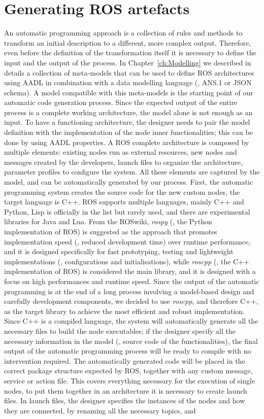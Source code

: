 \section{Generating ROS artefacts}
An automatic programming approach is a collection of rules and methods to transform an initial description to a different, more complex output. Therefore, even before the definition of the transformation itself it is necessary to define the input and the output of the process. In Chapter~\ref{ch:Modelling} we described in details a collection of meta-models that can be used to define ROS architectures using AADL in combination with a data modelling language (\ie, ANS.1 or JSON schema). A model compatible with this meta-models is the starting point of our automatic code generation process. Since the expected output of the entire process is a complete working architecture, the model alone is not enough as an input. To have a functioning architecture, the designer needs to pair the model definition with the implementation of the node inner functionalities; this can be done by using AADL properties. A ROS complete architecture is composed by multiple elements: existing nodes run as external resources, new nodes and messages created by the developers, launch files to organize the architecture, parameter profiles to configure the system. All these elements are  captured by the model, and can be automatically generated by our process. First, the automatic programming system creates the source code for the new custom nodes, the target language is C++. ROS supports multiple languages, mainly C++ and Python, Lisp is officially in the list but rarely used, and there are experimental libraries for Java and Lua. From the ROSwiki, \textit{rospy} (\ie, the Python implementation of ROS) is suggested as the approach that promotes implementation speed (\ie, reduced development time) over runtime performance, and it is designed specifically for fast prototyping, testing and lightweight implementations (\eg, configurations and initialisations), while \textit{roscpp} (\ie, the C++ implementation of ROS) is considered the main library, and it is designed with a focus on high performances and runtime speed. Since the output of the automatic programming is at the end of a long process involving a model-based design and carefully development components, we decided to use \textit{roscpp}, and therefore C++, as the target library to achieve the most efficient and robust implementation. Since C++ is a compiled language, the system will automatically generate all the necessary files to build the node executables; if the designer specify all the necessary information in the model (\ie, source code of the functionalities), the final output of the automatic programming process will be ready to compile with no intervention required. The automatically generated code will be placed in the correct package structure expected by ROS, together with any custom message, service or action file. This covers everything necessary for the execution of single nodes, to put them together in an architecture it is necessary to create launch files. In launch files, the designer specifies the instances of the nodes and how they are connected, by renaming all the necessary topics, and 